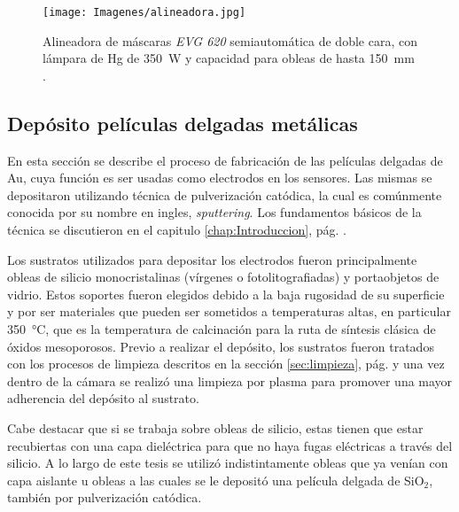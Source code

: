 			  \begin{figure}[h!]
			  \begin{center}
			  \texttt{[image: Imagenes/alineadora.jpg]}
			  \caption[Alineadora de máscaras]{Alineadora de máscaras \textit{EVG 620} semiautomática de doble cara, con lámpara de Hg de \SI{350}{W}  y capacidad para obleas de hasta \SI{150}{\mm} .}
			  \label{fig:alineadora}
			  \end{center}
			  \end{figure}

	\subsection{Depósito películas delgadas metálicas}\label{sec:sputt}

			En esta sección se describe el proceso de fabricación de las películas delgadas de Au, cuya función es ser usadas como electrodos en los sensores. Las mismas se depositaron utilizando técnica de pulverización catódica, la cual es comúnmente conocida por su nombre en ingles, \textit{sputtering}\cite{sigmund1968}. Los fundamentos básicos de la técnica se discutieron en el capitulo \ref{chap:Introduccion}, pág. \pageref{sec:microfabricacion}.
							
			Los sustratos utilizados para depositar los electrodos fueron principalmente obleas de silicio monocristalinas (vírgenes o fotolitografiadas) y portaobjetos de vidrio. Estos soportes fueron elegidos debido a la baja rugosidad de su superficie y por ser materiales que pueden ser sometidos a temperaturas altas, en particular \SI{350}{\celsius}, que es la temperatura de calcinación para la ruta de síntesis clásica de óxidos mesoporosos. Previo a realizar el depósito, los sustratos fueron tratados con los procesos de limpieza descritos en la sección \ref{sec:limpieza}, pág. \pageref{sec:limpieza} y una vez dentro de la cámara se realizó una limpieza por plasma para promover una mayor adherencia del depósito al sustrato.

			Cabe destacar que si se trabaja sobre obleas de silicio, estas tienen que estar recubiertas con una capa dieléctrica para que no haya fugas eléctricas a través del silicio. A lo largo de este tesis se utilizó indistintamente obleas que ya venían con capa aislante u obleas a las cuales se le depositó una película delgada de SiO$_2$, también por pulverización catódica.

